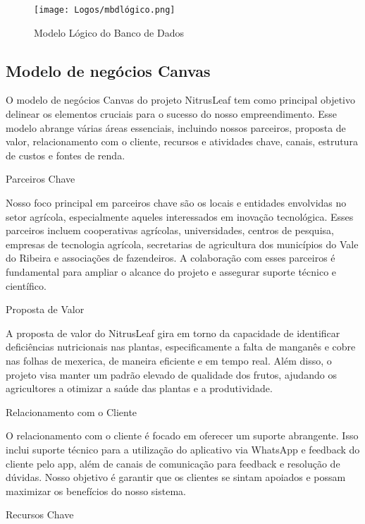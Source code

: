 \documentclass[
    a4paper,%
    12pt,%
    english,%
    brazilian,%
]{article}
\begin{document}
\begin{figure}[H]
\centering
\caption{Modelo Lógico do Banco de Dados}%
\label{fig:mbdlogico}
\texttt{[image: Logos/mbdlógico.png]}
\end{figure}

\subsection*{\textbf{Modelo de negócios Canvas}}

O modelo de negócios Canvas do projeto NitrusLeaf  tem como principal objetivo delinear os elementos cruciais para o sucesso do nosso empreendimento. Esse modelo abrange várias áreas essenciais, incluindo nossos parceiros, proposta de valor, relacionamento com o cliente, recursos e atividades chave, canais, estrutura de custos e fontes de renda.

Parceiros Chave

Nosso foco principal em parceiros chave são os locais e entidades envolvidas no setor agrícola, especialmente aqueles interessados em inovação tecnológica. Esses parceiros incluem cooperativas agrícolas, universidades, centros de pesquisa, empresas de tecnologia agrícola, secretarias de agricultura dos municípios do Vale do Ribeira e associações de fazendeiros. A colaboração com esses parceiros é fundamental para ampliar o alcance do projeto e assegurar suporte técnico e científico.

Proposta de Valor

A proposta de valor do NitrusLeaf gira em torno da capacidade de identificar deficiências nutricionais nas plantas, especificamente a falta de manganês e cobre nas folhas de mexerica, de maneira eficiente e em tempo real. Além disso, o projeto visa manter um padrão elevado de qualidade dos frutos, ajudando os agricultores a otimizar a saúde das plantas e a produtividade.

Relacionamento com o Cliente

O relacionamento com o cliente é focado em oferecer um suporte abrangente. Isso inclui suporte técnico para a utilização do aplicativo via WhatsApp e feedback do cliente pelo app, além de canais de comunicação para feedback e resolução de dúvidas. Nosso objetivo é garantir que os clientes se sintam apoiados e possam maximizar os benefícios do nosso sistema.

Recursos Chave
\end{document}
